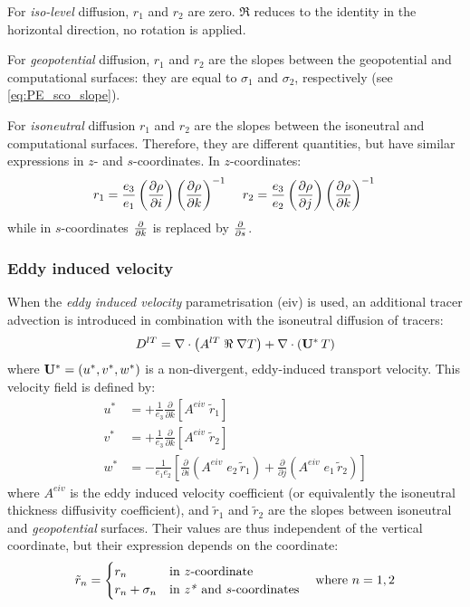 \documentclass[../main/NEMO_manual]{subfiles}
\begin{document}
For \textit{iso-level} diffusion, $r_1$ and $r_2 $ are zero.
$\Re $ reduces to the identity in the horizontal direction, no rotation is applied. 

For \textit{geopotential} diffusion,
$r_1$ and $r_2 $ are the slopes between the geopotential and computational surfaces:
they are equal to $\sigma_1$ and $\sigma_2$, respectively (see \autoref{eq:PE_sco_slope}).

For \textit{isoneutral} diffusion $r_1$ and $r_2$ are the slopes between the isoneutral and computational surfaces.
Therefore, they are different quantities, but have similar expressions in $z$- and $s$-coordinates.
In $z$-coordinates:
\begin{equation}
  \label{eq:PE_iso_slopes}
  r_1 =\frac{e_3 }{e_1 }	\left( \pd[\rho]{i} \right) \left( \pd[\rho]{k} \right)^{-1} \, \quad
  r_2 =\frac{e_3 }{e_2 }	\left( \pd[\rho]{j} \right) \left( \pd[\rho]{k} \right)^{-1} \,
\end{equation}
while in $s$-coordinates $\pd[]{k}$ is replaced by $\pd[]{s}$.

\subsubsection{Eddy induced velocity}
When the \textit{eddy induced velocity} parametrisation (eiv) \citep{Gent1990} is used,
an additional tracer advection is introduced in combination with the isoneutral diffusion of tracers:
\[
  D^{lT}=\nabla \cdot \left( {A^{lT}\;\Re \;\nabla T} \right)
  +\nabla \cdot \left( {{\vect{U}}^\ast \,T} \right)
\]
where ${\vect{U}}^\ast =\left( {u^\ast ,v^\ast ,w^\ast } \right)$ is a non-divergent,
eddy-induced transport velocity. This velocity field is defined by:
\[
  \begin{split}
    u^\ast  &= +\frac{1}{e_3       }\frac{\partial }{\partial k}\left[ {A^{eiv}\;\tilde{r}_1 } \right] \\
    v^\ast  &= +\frac{1}{e_3       }\frac{\partial }{\partial k}\left[ {A^{eiv}\;\tilde{r}_2 } \right] \\
    w^\ast &=  -\frac{1}{e_1 e_2 }\left[
      \frac{\partial }{\partial i}\left( {A^{eiv}\;e_2\,\tilde{r}_1 } \right)
      +\frac{\partial }{\partial j}\left( {A^{eiv}\;e_1\,\tilde{r}_2 } \right)      \right]
  \end{split}
\]
where $A^{eiv}$ is the eddy induced velocity coefficient
(or equivalently the isoneutral thickness diffusivity coefficient),
and $\tilde{r}_1$ and $\tilde{r}_2$ are the slopes between isoneutral and \emph{geopotential} surfaces.
Their values are thus independent of the vertical coordinate, but their expression depends on the coordinate: 
\begin{align}
  \label{eq:PE_slopes_eiv}
  \tilde{r}_n =
  \begin{cases}
    r_n            &      \text{in $z$-coordinate}    \\
    r_n + \sigma_n &      \text{in \textit{z*} and $s$-coordinates}
  \end{cases}
                     \quad \text{where } n=1,2
\end{align}
\end{document}
